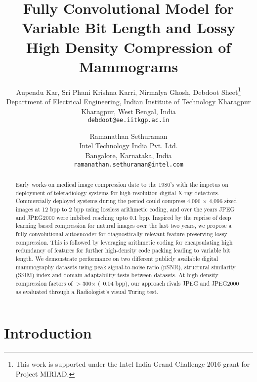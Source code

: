 \documentclass[10pt,twocolumn,letterpaper]{article}
\begin{document}
\title{Fully Convolutional Model for Variable Bit Length and Lossy High Density Compression of Mammograms}

\author{Aupendu Kar, Sri Phani Krishna Karri, Nirmalya Ghosh, Debdoot Sheet\thanks{This work is supported under the Intel India Grand Challenge 2016 grant for Project MIRIAD.}\\
Department of Electrical Engineering, Indian Institute of Technology Kharagpur\\
Kharagpur, West Bengal, India\\
{\tt\small debdoot@ee.iitkgp.ac.in}
\and
Ramanathan Sethuraman\\
Intel Technology India Pvt. Ltd.\\
Bangalore, Karnataka, India\\
{\tt\small ramanathan.sethuraman@intel.com}
}

\maketitle

\begin{abstract}

Early works on medical image compression date to the 1980's with the impetus on deployment of teleradiology systems for high-resolution digital X-ray detectors. Commercially deployed systems during the period could compress 4,096 $\times$ 4,096 sized images at 12 bpp to 2 bpp using lossless arithmetic coding, and over the years JPEG and JPEG2000 were imbibed reaching upto 0.1 bpp. Inspired by the reprise of deep learning based compression for natural images over the last two years, we propose a fully convolutional autoencoder for diagnostically relevant feature preserving lossy compression. This is followed by leveraging arithmetic coding for encapsulating high redundancy of features for further high-density code packing leading to variable bit length. We demonstrate performance on two different publicly available digital mammography datasets using peak signal-to-noise ratio (pSNR), structural similarity (SSIM) index and domain adaptability tests between datasets. At high density compression factors of $>$300$\times$ (~0.04 bpp), our approach rivals JPEG and JPEG2000 as evaluated through a Radiologist's visual Turing test.

\end{abstract}

\section{Introduction}
\end{document}
